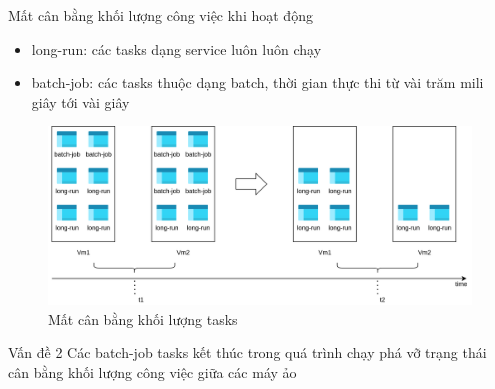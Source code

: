\documentclass[11pt,xcolor={dvipsnames}, aspectratio=169]{beamer}
\begin{document}


\begin{frame}
{Mất cân bằng khối lượng công việc khi hoạt động}

\begin{minipage}[t]{0.34\linewidth}
	\begin{itemize}
		\item long-run: các tasks dạng service luôn luôn chạy 
		\item batch-job: các tasks thuộc dạng batch, thời gian thực thi từ vài trăm mili giây tới vài giây 
	\end{itemize}
\end{minipage}
\hfill
\begin{minipage}[t]{0.65\linewidth}
\begin{figure}
	\centering
	\includegraphics[scale=0.35]{images/unload_balancing.png}
	\caption{Mất cân bằng khối lượng tasks}
	\label{fig:unload_balancing}
\end{figure}
\end{minipage}
\pause
	\begin{block}
	{\centering Vấn đề 2}
		\centering Các batch-job tasks kết thúc trong quá trình chạy phá vỡ trạng thái cân bằng khối lượng công việc giữa các máy ảo 
	\end{block}
\end{frame}
\end{document}
